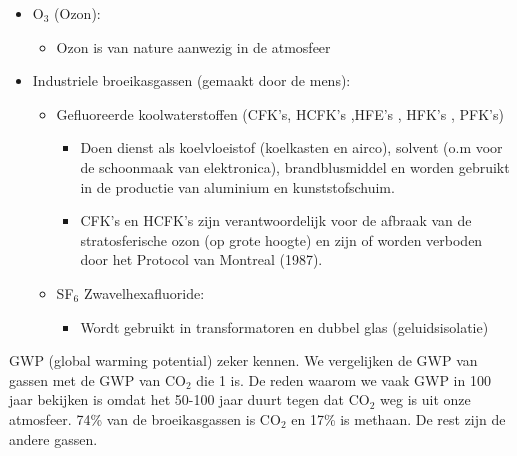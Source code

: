 \documentclass[12pt]{article}
\begin{document}
\begin{itemize}
\begin{itemize}
        \item O$_3$ (Ozon):\begin{itemize}
            \item Ozon is van nature aanwezig in de atmosfeer
        \end{itemize}
        \item Industriele broeikasgassen (gemaakt door de mens):\begin{itemize}
            \item Gefluoreerde koolwaterstoffen (CFK's, HCFK's ,HFE's , HFK's , PFK's)\begin{itemize}
                \item Doen dienst als koelvloeistof (koelkasten en airco), solvent (o.m voor de schoonmaak van elektronica), brandblusmiddel en worden gebruikt in de productie van aluminium en kunststofschuim.
                \item CFK's en HCFK's zijn verantwoordelijk voor de afbraak van de stratosferische ozon (op grote hoogte) en zijn of worden verboden door het Protocol van Montreal (1987).
            \end{itemize}
            \item SF$_6$ Zwavelhexafluoride:\begin{itemize}
                \item Wordt gebruikt in transformatoren en dubbel glas (geluidsisolatie)
            \end{itemize}
        \end{itemize}
    \end{itemize}
\end{itemize}
GWP (global warming potential) zeker kennen. We vergelijken de GWP van gassen met de GWP van CO$_2$ die 1 is.
De reden waarom we vaak GWP in 100 jaar bekijken is omdat het 50-100 jaar duurt tegen dat CO$_2$ weg is uit onze atmosfeer. 74\% van de broeikasgassen is CO$_2$ en 17\% is methaan. De rest zijn de andere gassen.
\end{document}
